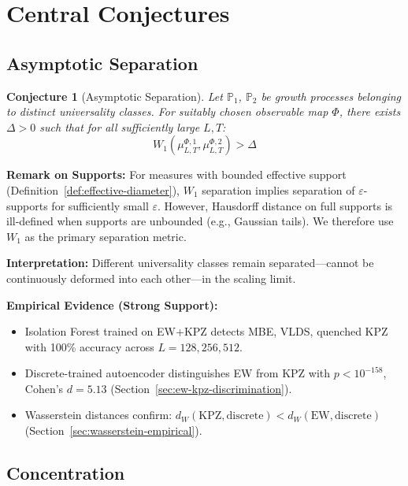 \documentclass[aps,pre,reprint,amsmath,amssymb,superscriptaddress]{revtex4-2}
\newtheorem{conjecture}{Conjecture}
\newcommand{\EW}{\text{EW}}
\newcommand{\KPZ}{\text{KPZ}}
\newcommand{\bbP}{\mathbb{P}}
\begin{document}
\section{Central Conjectures}
\label{sec:conjectures}

\subsection{Asymptotic Separation}

\begin{conjecture}[Asymptotic Separation]
\label{conj:separation}
Let $\bbP_1$, $\bbP_2$ be growth processes belonging to distinct universality classes. For suitably chosen observable map $\Phi$, there exists $\Delta > 0$ such that for all sufficiently large $L, T$:
\begin{equation}
W_1(\mu^{\Phi,1}_{L,T}, \mu^{\Phi,2}_{L,T}) > \Delta
\end{equation}
\end{conjecture}

\textbf{Remark on Supports:} For measures with bounded effective support (Definition~\ref{def:effective-diameter}), $W_1$ separation implies separation of $\varepsilon$-supports for sufficiently small $\varepsilon$. However, Hausdorff distance on full supports is ill-defined when supports are unbounded (e.g., Gaussian tails). We therefore use $W_1$ as the primary separation metric.

\textbf{Interpretation:} Different universality classes remain separated---cannot be continuously deformed into each other---in the scaling limit.

\textbf{Empirical Evidence (Strong Support):}
\begin{itemize}
\item Isolation Forest trained on EW+KPZ detects MBE, VLDS, quenched KPZ with 100\% accuracy across $L = 128, 256, 512$.
\item Discrete-trained autoencoder distinguishes EW from KPZ with $p < 10^{-158}$, Cohen's $d = 5.13$ (Section~\ref{sec:ew-kpz-discrimination}).
\item Wasserstein distances confirm: $d_W(\KPZ, \text{discrete}) < d_W(\EW, \text{discrete})$ (Section~\ref{sec:wasserstein-empirical}).
\end{itemize}

\subsection{Concentration}
\end{document}
